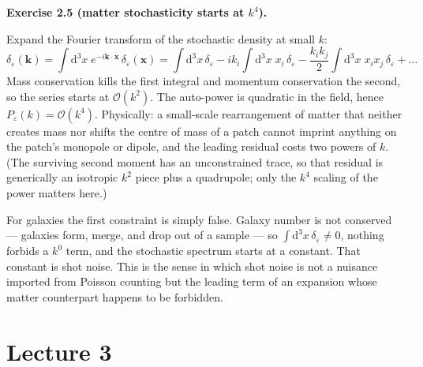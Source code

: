 \documentclass[a4paper,11pt]{article}
\newcommand{\vx}{\bm{x}}
\newcommand{\vk}{\bm{k}}
\newcommand{\dd}{\mathrm{d}}
\newenvironment{solution}[1]
  {\par\medskip\noindent\textbf{#1}\par\nobreak\smallskip}
  {\par\medskip}
\begin{document}
\begin{solution}{Exercise 2.5 (matter stochasticity starts at $k^4$).}
Expand the Fourier transform of the stochastic density at small $k$:
\begin{equation*}
\delta_\varepsilon(\vk) = \int\!\dd^3x\;e^{-i\vk\cdot\vx}\,\delta_\varepsilon(\vx)
= \int\!\dd^3x\,\delta_\varepsilon
- i k_i\!\int\!\dd^3x\;x_i\,\delta_\varepsilon
- \frac{k_ik_j}{2}\!\int\!\dd^3x\;x_ix_j\,\delta_\varepsilon
+ \ldots
\end{equation*}
Mass conservation kills the first integral and momentum conservation the second,
so the series starts at $\mathcal{O}(k^2)$. The auto-power is quadratic in the
field, hence $P_\varepsilon(k) = \mathcal{O}(k^4)$. Physically: a small-scale
rearrangement of matter that neither creates mass nor shifts the centre of mass
of a patch cannot imprint anything on the patch's monopole or dipole, and the
leading residual costs two powers of $k$. (The surviving second
moment has an unconstrained trace, so that residual is generically an isotropic
$k^2$ piece plus a quadrupole; only the $k^4$ scaling of the power matters
here.)

For galaxies the first constraint is simply false. Galaxy number is not
conserved --- galaxies form, merge, and drop out of a sample --- so
$\int\!\dd^3x\,\delta_\varepsilon \ne 0$, nothing forbids a $k^0$ term, and the
stochastic spectrum starts at a constant. That constant is shot noise. This is
the sense in which shot noise is not a nuisance imported from Poisson counting
but the leading term of an expansion whose matter counterpart happens to be
forbidden.
\end{solution}

\section*{Lecture 3}
\end{document}
